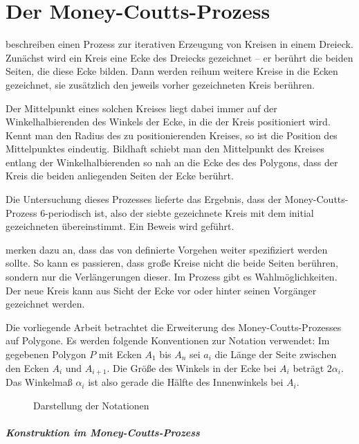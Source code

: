 \chapter{Der Money-Coutts-Prozess}

\citet{EMT1974} beschreiben einen Prozess zur iterativen Erzeugung von Kreisen in einem Dreieck.
Zunächst wird ein Kreis eine Ecke des Dreiecks gezeichnet --
er berührt die beiden Seiten, die diese Ecke bilden.
Dann werden reihum weitere Kreise in die Ecken gezeichnet,
sie zusätzlich den jeweils vorher gezeichneten Kreis berühren.

Der Mittelpunkt eines solchen Kreises liegt dabei immer auf der Winkelhalbierenden des Winkels der Ecke, in die der Kreis positioniert wird.
Kennt man den Radius des zu positionierenden Kreises, so ist die Position des Mittelpunktes eindeutig.
Bildhaft schiebt man den Mittelpunkt des Kreises entlang der Winkelhalbierenden so nah an die Ecke des des Polygons,
dass der Kreis die beiden anliegenden Seiten der Ecke berührt.

Die Untersuchung dieses Prozesses lieferte das Ergebnis,
dass der Money-Coutts-Prozess 6-periodisch ist,
also der siebte gezeichnete Kreis mit dem initial gezeichneten übereinstimmt.
Ein Beweis wird  geführt.

\citet{Taba2013} merken dazu an,
dass das von \citet{EMT1974} definierte Vorgehen weiter spezifiziert werden sollte.
So kann es passieren, dass große Kreise nicht die beide Seiten berühren,
sondern nur die Verlängerungen dieser.
Im Prozess gibt es Wahlmöglichkeiten.
Der neue Kreis kann aus Sicht der Ecke vor oder hinter seinen Vorgänger gezeichnet werden.

Die vorliegende Arbeit betrachtet die Erweiterung des Money-Coutts-Prozesses auf Polygone.
Es werden folgende Konventionen zur Notation verwendet:
Im gegebenen Polygon $P$ mit Ecken $A_1$ bis $A_n$ sei $a_i$ die Länge der Seite zwischen den Ecken $A_i$ und $A_{i+1}$.
Die Größe des Winkels in der Ecke bei $A_i$ beträgt $2\alpha_i$.
Das Winkelmaß $\alpha_i$ ist also gerade die Hälfte des Innenwinkels bei $A_i$.

\begin{figure}[htbp]
    
    \caption{Darstellung der Notationen}
\end{figure}

\paragraph{Konstruktion im Money-Coutts-Prozess}

